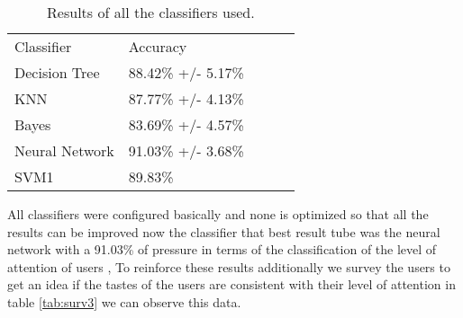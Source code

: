 \begin{table}
\small
\centering
\captionsetup{font=footnotesize}
\caption{Results of all the classifiers used.}
\label{tab:Allclass} 
\small
\begin{tabular}{p{3cm} p{1cm} p{1cm} p{1cm} p{2cm} }
\hline{\smallskip}
Classifier & Accuracy\\
\noalign{\smallskip}\hline\noalign{\smallskip}
\small{	Decision Tree	}& \small{	88.42\% +/- 5.17\%	}\\
\small{	KNN	}& \small{	87.77\% +/- 4.13\%	}\\
\small{	Bayes	}& \small{	83.69\% +/- 4.57\%	}\\
\small{	Neural Network	}& \small{	91.03\% +/- 3.68\% 	}\\
\small{	SVM1	}& \small{	89.83\%	}\\
\hline
\end{tabular}
\end{table}
All classifiers were configured basically and none is optimized so that all the results can be improved now the classifier that best result tube was the neural network with a 91.03\% of pressure in terms of the classification of the level of attention of users , To reinforce these results additionally we survey the users to get an idea if the tastes of the users are consistent with their level of attention in table \ref{tab:surv3} we can observe this data.
